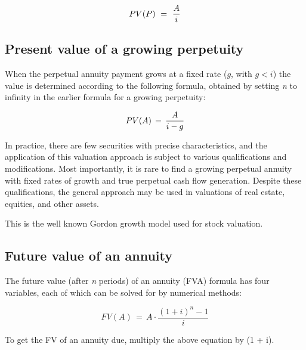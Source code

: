 $$PV(P) \ = \ { A \over i }$$




\subsection{Present value of a growing perpetuity}
\label{sss:pres-2d58}




When the perpetual annuity payment grows at a fixed rate ($g$, with $g<i$) the value is determined according to the following formula, obtained by
setting \textit{n} to infinity in the earlier formula for a growing perpetuity:



$$PV(A)\,=\,{A \over i-g}$$



In practice, there are few securities with precise characteristics, and the application of
this valuation approach is subject to various qualifications and modifications. Most
importantly, it is rare to find a growing perpetual annuity with fixed rates of growth and
true perpetual cash flow generation. Despite these qualifications, the general approach
may be used in valuations of real estate, equities, and other assets.



This is the well known Gordon growth model used for stock valuation.




\subsection{Future value of an annuity}
\label{sss:futu-0df8}




The future value (after \textit{n} periods) of an annuity (FVA) formula has four
variables, each of which can be solved for by numerical methods:



$$FV(A) \,=\,A\cdot\frac{\left(1+i\right)^n-1}{i}$$



To get the FV of an annuity due, multiply the above equation by (1 + i).





